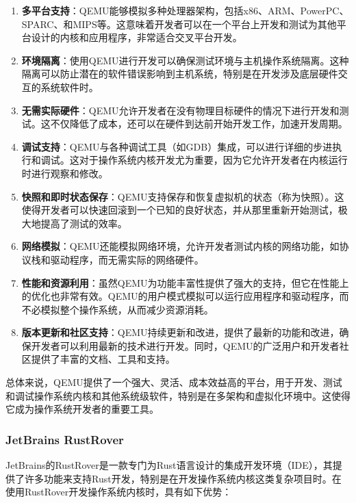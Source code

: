 \begin{enumerate}
    \item \textbf{多平台支持}：QEMU能够模拟多种处理器架构，包括x86、ARM、PowerPC、SPARC、和MIPS等。这意味着开发者可以在一个平台上开发和测试为其他平台设计的内核和应用程序，非常适合交叉平台开发。
    \item \textbf{环境隔离}：使用QEMU进行开发可以确保测试环境与主机操作系统隔离。这种隔离可以防止潜在的软件错误影响到主机系统，特别是在开发涉及底层硬件交互的系统软件时。
    \item \textbf{无需实际硬件}：QEMU允许开发者在没有物理目标硬件的情况下进行开发和测试。这不仅降低了成本，还可以在硬件到达前开始开发工作，加速开发周期。
    \item \textbf{调试支持}：QEMU与各种调试工具（如GDB）集成，可以进行详细的步进执行和调试。这对于操作系统内核开发尤为重要，因为它允许开发者在内核运行时进行观察和修改。
    \item \textbf{快照和即时状态保存}：QEMU支持保存和恢复虚拟机的状态（称为快照）。这使得开发者可以快速回滚到一个已知的良好状态，并从那里重新开始测试，极大地提高了测试的效率。
    \item \textbf{网络模拟}：QEMU还能模拟网络环境，允许开发者测试内核的网络功能，如协议栈和驱动程序，而无需实际的网络硬件。
    \item \textbf{性能和资源利用}：虽然QEMU为功能丰富性提供了强大的支持，但它在性能上的优化也非常有效。QEMU的用户模式模拟可以运行应用程序和驱动程序，而不必模拟整个操作系统，从而减少资源消耗。
    \item \textbf{版本更新和社区支持}：QEMU持续更新和改进，提供了最新的功能和改进，确保开发者可以利用最新的技术进行开发。同时，QEMU的广泛用户和开发者社区提供了丰富的文档、工具和支持。
\end{enumerate}

总体来说，QEMU提供了一个强大、灵活、成本效益高的平台，用于开发、测试和调试操作系统内核和其他系统级软件，特别是在多架构和虚拟化环境中。这使得它成为操作系统开发者的重要工具。

\subsubsection{JetBrains RustRover}

JetBrains的RustRover是一款专门为Rust语言设计的集成开发环境（IDE），其提供了许多功能来支持Rust开发，特别是在开发操作系统内核这类复杂项目时。在使用RustRover开发操作系统内核时，具有如下优势：

